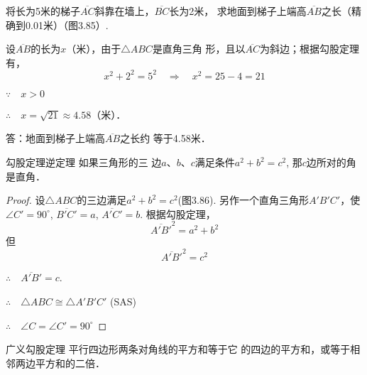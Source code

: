 \begin{example}
    将长为5米的梯子$\overline{AC}$斜靠在墙上，$\overline{BC}$长为2米，
求地面到梯子上端高$\overline{AB}$之长（精确到0.01米）（图3.85）.
\end{example}



\begin{solution}
    设$\overline{AB}$的长为$x$（米），由于$\triangle ABC$是直角三角
形，且以$\overline{AC}$为斜边；根据勾股定理有，
\[x^2+2^2=5^2 \quad \Rightarrow\quad x^2=25-4=21\]

$\because\quad x>0$

$\therefore\quad x=\sqrt{21}\approx 4.58$（米）．

答：地面到梯子上端高$\overline{AB}$之长约
等于4.58米．
\end{solution}

\begin{blk}
    {勾股定理逆定理} 如果三角形的三
边$a$、$b$、$c$满足条件$a^2+b^2=c^2$, 那$c$边所对的角是直角．
\end{blk}


\begin{proof}
设$\triangle ABC$的三边满足$a^2+b^2=c^2$(图3.86). 
另作一个直角三角形$A'B'C'$，使$\angle C'=90^{\circ}$, $\overline{B'C'}=a$,
$\overline{A'C'}=b$. 根据勾股定理，
\[\overline{A' B'}^2=a^2+b^2\]
但
\[\overline{A'B'}^2=c^2\]

$\therefore\quad \overline{A'B'}=c$.

$\therefore\quad \triangle ABC\cong \triangle A'B'C'$ (SAS)

$\therefore\quad \angle C=\angle C'=90^{\circ}$
\end{proof}

\begin{figure}[htp]
    \centering
{}
    \caption{}
\end{figure}

\begin{blk}
    {广义勾股定理} 平行四边形两条对角线的平方和等于它
的四边的平方和，或等于相邻两边平方和的二倍．
\end{blk}

